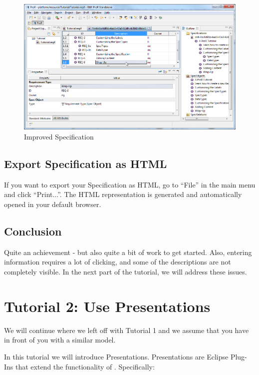 \begin{figure}[h!]
\centering      
\includegraphics[width=\linewidth]{../rmf-images/pror_speceditor_2.png}      
\caption{Improved Specification}      
\label{fig:improvedSpec}
\end{figure}

\subsection{Export Specification as HTML}

If you want to export your Specification as HTML, go to ``File'' in the
main menu and click ``Print...''. The HTML representation is generated
and automatically opened in your default browser.

\subsection{Conclusion}

Quite an achievement - but also quite a bit of work to get started.
Also, entering information requires a lot of clicking, and some of the
descriptions are not completely visible. In the next part of the
tutorial, we will address these issues.

\section{Tutorial 2: Use Presentations}

We will continue where we left off with Tutorial 1 and we assume that
you have \pror{} in front of you with a similar model.

In this tutorial we will introduce Presentations. Presentations are
Eclipse Plug-Ins that extend the functionality of \pror{}. Specifically:

